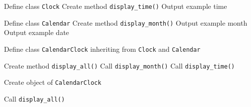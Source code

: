 \begin{algorithm}
\caption{Display Calendar and Clock Information using Multiple Inheritance}
\begin{algorithmic}[1]

\STATE Define class \texttt{Clock}
\STATE Create method \texttt{display\_time()}
\STATE Output example time

\STATE Define class \texttt{Calendar}
\STATE Create method \texttt{display\_month()}
\STATE Output example month
\STATE Output example date

\STATE Define class \texttt{CalendarClock} inheriting from \texttt{Clock} and \texttt{Calendar}

\STATE Create method \texttt{display\_all()}
\STATE Call \texttt{display\_month()}
\STATE Call \texttt{display\_time()}

\STATE Create object of \texttt{CalendarClock}

\STATE Call \texttt{display\_all()}

\end{algorithmic}
\end{algorithm}
